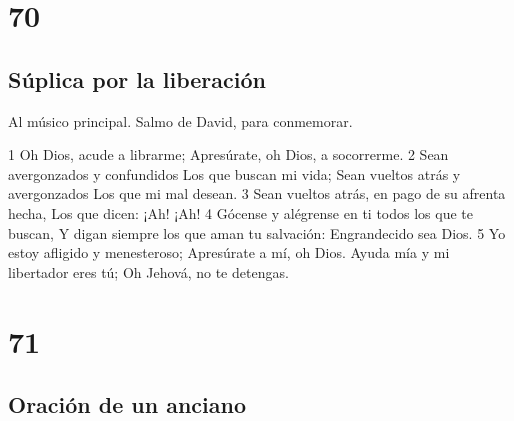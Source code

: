 \chapter{70}

\section*{Súplica por la liberación}

Al músico principal. Salmo de David, para conmemorar.

1 Oh Dios, acude a librarme;
Apresúrate, oh Dios, a socorrerme.
2 Sean avergonzados y confundidos
Los que buscan mi vida;
Sean vueltos atrás y avergonzados
Los que mi mal desean.
3 Sean vueltos atrás, en pago de su afrenta hecha,
Los que dicen: ¡Ah! ¡Ah!
4 Gócense y alégrense en ti todos los que te buscan,
Y digan siempre los que aman tu salvación:
Engrandecido sea Dios.
5 Yo estoy afligido y menesteroso;
Apresúrate a mí, oh Dios.
Ayuda mía y mi libertador eres tú;
Oh Jehová, no te detengas.

\chapter{71}

\section*{Oración de un anciano}

